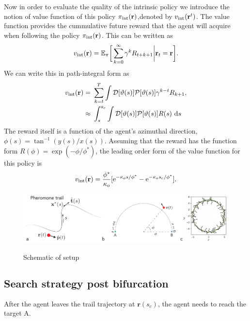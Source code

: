 \documentclass[%
reprint,
superscriptaddress,
floatfix,
amsmath,
amssymb,
aps,
notitlepage
]{revtex4-1}
\def\d{\text{d}}
\def\e{\text{e}}
\def\r{\mathbf{r}}
\def\E{\mathbb{E}}
\def\P{\mathcal{P}}
\def\D{\mathcal{D}}
\def\theta{\vartheta}
\begin{document}
Now in order to evaluate the quality of the intrinsic policy we introduce the notion of value function
of this policy $\pi_{\rm int}(\r)$,denoted by $v_{\rm int}(\r^t)$. The value function provides the cummulative
future reward that the agent will acquire when following the policy $\pi_{\rm int}(\r)$. This can be written as
\[
    v_{\rm int}(\r) = \E_\pi \bigg[ \sum_{k=0}^\infty \gamma^k R_{t+k+1} \bigg| \r_t = \r \bigg].
\]
We can write this in path-integral form as
\begin{align}
    v_{\rm int}(\r) =& \ \sum_{k=t}^T \int \D[\theta(s)] \P[\theta(s)] \gamma^{k-t} R_{k+1}, \\
    \approx& \ \int_{s}^{s_c} \int \D[\theta(s)] \P[\theta(s)] R(s) \ \d s
\end{align}
The reward itself is a function of the agent's azimuthal direction, $\phi(s) = \tan^{-1}(y(s)/x(s))$.
Assuming that the reward has the function form $R(\phi) = \exp(-\phi/\phi^*)$, the leading order form of 
the value function for this policy is
\[
    v_{\rm int}(\r) = \frac{\phi^*}{\kappa_o} [ \e^{-\kappa_os/\phi^*} - \e^{-\kappa_o s_c/\phi^*}].
\]

\begin{figure}
    \centering
    \includegraphics[width=\textwidth]{./figs/schematic.pdf}\label{fig:schm1}
    \caption{Schematic of setup}
\end{figure}

\subsection*{Search strategy post bifurcation}
After the agent leaves the trail trajectory at $\r(s_c)$, the agent needs to reach the target A.
\end{document}
